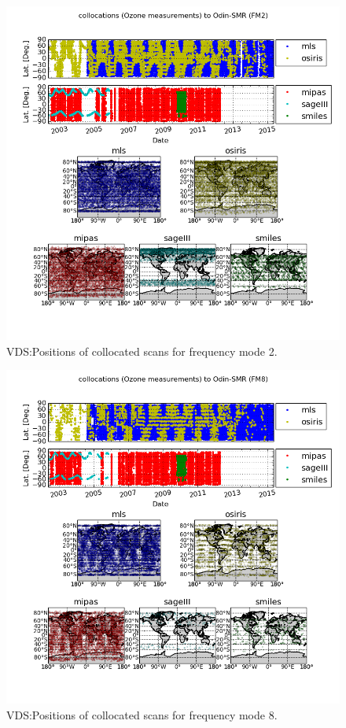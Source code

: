 \begin{figure}[t]
\centering
\includegraphics[width=17cm]{test_collocation_fm2.png}
\caption{VDS:Positions of collocated scans for frequency mode 2.}
\label{fig:vdsfm2}
\end{figure}


\begin{figure}[t]
\centering
\includegraphics[width=17cm]{test_collocation_fm8.png}
\caption{VDS:Positions of collocated scans for frequency mode 8.}
\label{fig:vdsfm8}
\end{figure}


